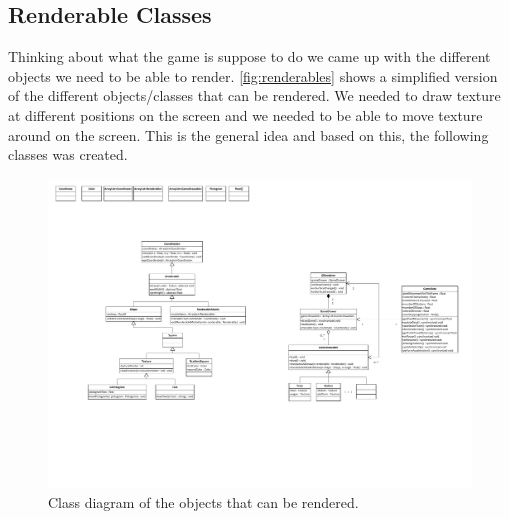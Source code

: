 \subsection{Renderable Classes}\label{sec:renderables}

Thinking about what the game is suppose to do we came up with the different objects we need to be able to render. \autoref{fig:renderables} shows a simplified version of the different objects/classes that can be rendered. We needed to draw texture at different positions on the screen and we needed to be able to move texture around on the screen. This is the general idea and based on this, the following classes was created.

\begin{figure}[H]
\centering
\includegraphics[page=2,width=1\linewidth]{img/opengl.pdf}
\caption{Class diagram of the objects that can be rendered.}
\label{fig:renderables}
\end{figure}

